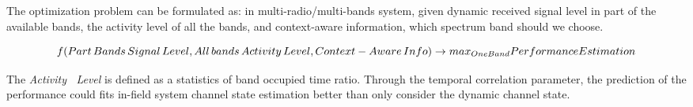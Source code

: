 

The optimization problem can be formulated as: in multi-radio/multi-bands system, given dynamic received signal level in part of the available bands, the activity level of all the bands, and context-aware information, which spectrum band should we choose. 






\begin{equation}
f(Part\, Bands\, Signal\, Level, All\,bands\, Activity\, Level,Context-Aware\, Info)\\
\rightarrow max_{One Band}{Performance Estimation}
\end{equation}

The \emph{Activity \, Level} is defined as a statistics of band occupied time ratio. Through the temporal correlation parameter, the prediction of the performance could fits in-field system channel state estimation better than only consider the dynamic channel state.


